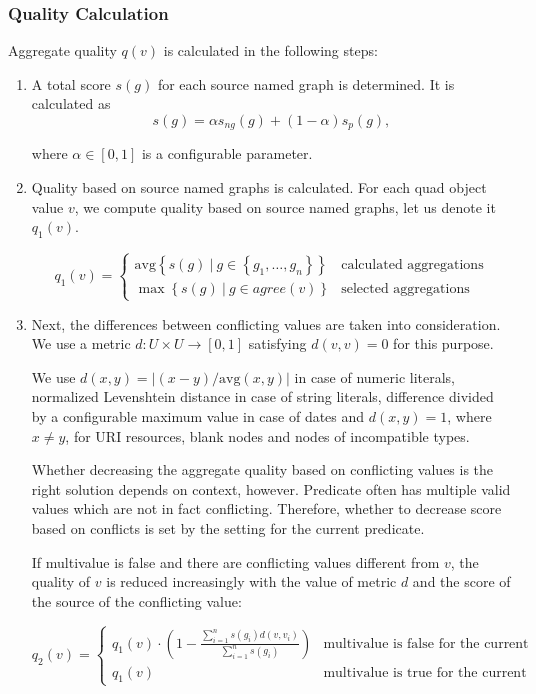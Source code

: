 \subsubsection{Quality Calculation}
\label{sec:qualityCalculation}
Aggregate quality $q(v)$ is calculated in the following steps:
\begin{enumerate}
	\item A total \QA score $s(g)$ for each source named graph is determined. It is calculated as
		$$s(g) = \alpha s_{ng}(g) + (1-\alpha) s_p(g),$$

		where $\alpha\in[0,1]$ is a configurable parameter.
	\item Quality based on source named graphs is calculated. For each quad object value $v$, we compute quality based on source named graphs, let us denote it $q_1(v)$.

		$$q_1(v) = \begin{cases}
				\mathrm{avg} \left\{s(g)~|~g\in \left\{g_1,\ldots,g_n\right\}	\right\} & \mbox{calculated aggregations} \\
				\max \left\{s(g)~|~g\in agree(v)\right\} & \mbox{selected aggregations}
			\end{cases} $$
	\item Next, the differences between conflicting values are taken into consideration. We use a metric $d:U\times U\rightarrow[0,1]$ satisfying $d(v,v)=0$ for this purpose.

		We use $d(x,y)=|(x-y) / \mathrm{avg}(x,y)|$ in case of numeric literals, normalized Levenshtein distance in case of string literals, difference divided by a configurable maximum value in case of dates and $d(x,y)=1$, where $x\neq y$, for URI resources, blank nodes and nodes of incompatible types.

		Whether decreasing the aggregate quality based on conflicting values is the right solution depends on context, however. Predicate  often has multiple valid values which are not in fact conflicting. Therefore, whether to decrease score based on conflicts is set by the  setting for the current predicate.
		
		If multivalue is false and there are conflicting values different from $v$, the  quality of $v$ is reduced increasingly with the value of metric $d$ and the score of the source of the conflicting value:

		$$q_2(v) = \begin{cases}
				q_1(v) \cdot \left(1- \frac{\sum_{i=1}^{n}s(g_i)d(v,v_i)}{\sum_{i=1}^ns(g_i)}\right) & \mbox{multivalue is false for the current property}\\
				q_1(v) & \mbox{multivalue is true for the current property} 
			\end{cases}
		$$
		

\end{enumerate}
